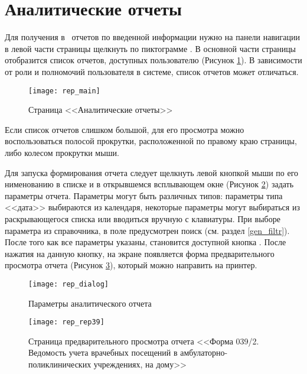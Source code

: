 \newpage
\section{Аналитические отчеты}

Для получения в \tmis~отчетов по введенной информации нужно на панели навигации в левой части страницы щелкнуть по пиктограмме . В основной части страницы отобразится список отчетов, доступных пользователю (Рисунок \ref{img_rep_main}). В зависимости от роли и полномочий пользователя в системе, список отчетов может отличаться.

\begin{figure}[ht]\centering
	\texttt{[image: rep\_main]}
	\caption{Страница <<Аналитические отчеты>>}
	\label{img_rep_main}
\end{figure}

Если список отчетов слишком большой, для его просмотра можно воспользоваться полосой прокрутки, расположенной по правому краю страницы, либо колесом прокрутки мыши.

Для запуска формирования отчета следует щелкнуть левой кнопкой мыши по его нименованию в списке и в открывшемся всплывающем окне (Рисунок \ref{img_rep_dialog}) задать параметры отчета. Параметры могут быть различных типов: параметры типа <<дата>> выбираются из календаря, некоторые параметры могут выбираться из раскрывающегося списка или вводиться вручную с клавиатуры. При выборе параметра из справочника, в поле предусмотрен поиск (см. раздел \ref{gen_filtr}). После того как все параметры указаны, становится доступной кнопка . После нажатия на данную кнопку, на экране появляется форма предварительного просмотра отчета (Рисунок \ref{img_rep_rep39}), который можно направить на принтер.

\begin{figure}[ht]\centering
	\texttt{[image: rep\_dialog]}
	\caption{Параметры аналитического отчета}
	\label{img_rep_dialog}
\end{figure}

\begin{figure}[!ht]\centering
	\texttt{[image: rep\_rep39]}
	\caption{Страница предварительного просмотра отчета <<Форма 039/2. Ведомость учета врачебных посещений в амбулаторно-поликлинических учреждениях, на дому>>}
	\label{img_rep_rep39}
\end{figure}
